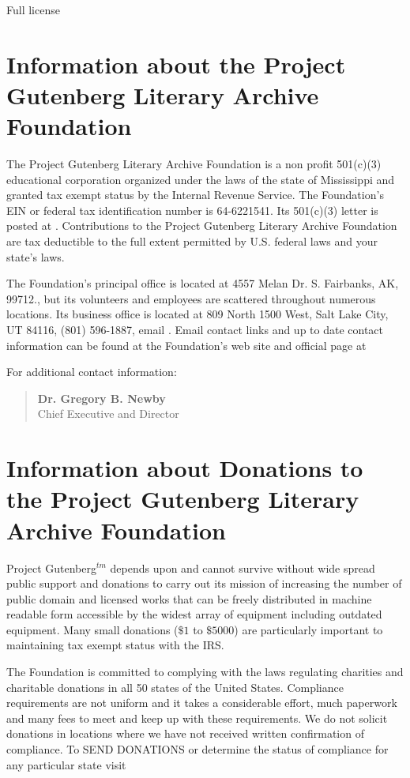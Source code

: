 \begin{chapter}{Full license}
\section[]{Information about the Project Gutenberg Literary Archive
Foundation}\label{section3}

The Project Gutenberg Literary Archive Foundation is a non profit
501(c)(3) educational corporation organized under the laws of the
state of Mississippi and granted tax exempt status by the Internal
Revenue Service.  The Foundation's EIN or federal tax identification
number is 64-6221541.  Its 501(c)(3) letter is posted at
. 
Contributions to the Project Gutenberg Literary Archive Foundation are tax
deductible to the full extent permitted by U.S. federal laws and your state's laws.

The Foundation's principal office is located at 4557 Melan Dr. S.
Fairbanks, AK, 99712., but its volunteers and employees are scattered
throughout numerous locations.  Its business office is located at
809 North 1500 West, Salt Lake City, UT 84116, (801) 596-1887, email
.  Email contact links and
up to date contact information can be found at the Foundation's web site and official
page at 

For additional contact information:
\begin{quote}
     \textbf{Dr. Gregory B. Newby}\\
     Chief Executive and Director\\
\end{quote}


\section[]{Information about Donations to the Project Gutenberg
Literary Archive Foundation}\label{section4}

Project Gutenberg$^{tm}$ depends upon and cannot survive without wide
spread public support and donations to carry out its mission of
increasing the number of public domain and licensed works that can be
freely distributed in machine readable form accessible by the widest
array of equipment including outdated equipment.  Many small donations
($\$1$ to $\$5000$) are particularly important to maintaining tax exempt
status with the IRS.

The Foundation is committed to complying with the laws regulating
charities and charitable donations in all 50 states of the United
States.  Compliance requirements are not uniform and it takes a
considerable effort, much paperwork and many fees to meet and keep up
with these requirements.  We do not solicit donations in locations
where we have not received written confirmation of compliance.  To
SEND DONATIONS or determine the status of compliance for any
particular state visit 


\end{chapter}
